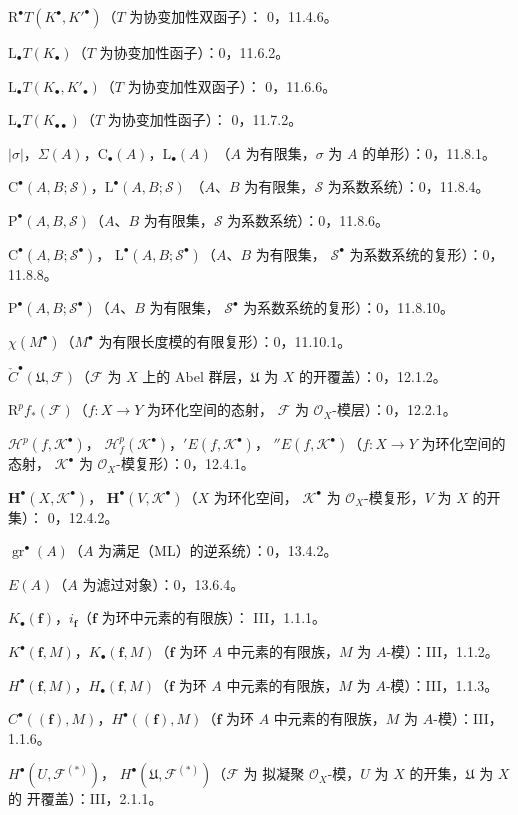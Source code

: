 \documentclass[UTF8,fontset=none,11pt,oneside,openany]{ctexbook}
\begin{document}
\begin{flushleft}
$\mathrm R^\bullet T(K^\bullet,K'^{\bullet})$（$T$ 为协变加性双函子）：
0，11.4.6。

$\mathrm L_\bullet T(K_\bullet)$（$T$ 为协变加性函子）：0，11.6.2。

$\mathrm L_\bullet T(K_\bullet,K'_\bullet)$（$T$ 为协变加性双函子）：
0，11.6.6。

$\mathrm L_\bullet T(K_{\bullet\bullet})$（$T$ 为协变加性函子）：
0，11.7.2。

$|\sigma|$，$\Sigma(A)$，$\mathrm C_\bullet(A)$，$\mathrm L_\bullet(A)$
（$A$ 为有限集，$\sigma$ 为 $A$ 的单形）：0，11.8.1。

$\mathrm C^\bullet(A,B;\mathscr S)$，$\mathrm L^\bullet(A,B;\mathscr S)$
（$A$、$B$ 为有限集，$\mathscr S$ 为系数系统）：0，11.8.4。

$\mathrm P^\bullet(A,B,\mathscr S)$（$A$、$B$ 为有限集，$\mathscr S$
为系数系统）：0，11.8.6。

$\mathrm C^\bullet(A,B;\mathscr S^\bullet)$，
$\mathrm L^\bullet(A,B;\mathscr S^\bullet)$（$A$、$B$ 为有限集，
$\mathscr S^\bullet$ 为系数系统的复形）：0，11.8.8。

$\mathrm P^\bullet(A,B;\mathscr S^\bullet)$（$A$、$B$ 为有限集，
$\mathscr S^\bullet$ 为系数系统的复形）：0，11.8.10。

$\chi(M^\bullet)$（$M^\bullet$ 为有限长度模的有限复形）：0，11.10.1。

$\check C^\bullet(\mathfrak U,\mathcal F)$（$\mathcal F$ 为 $X$ 上的
Abel 群层，$\mathfrak U$ 为 $X$ 的开覆盖）：0，12.1.2。

$\mathrm R^pf_*(\mathcal F)$（$f:X\to Y$ 为环化空间的态射，
$\mathcal F$ 为 $\mathcal O_X$-模层）：0，12.2.1。

$\mathcal H^p(f,\mathcal K^\bullet)$，
$\mathcal H_f^p(\mathcal K^\bullet)$，${}'E(f,\mathcal K^\bullet)$，
${}''E(f,\mathcal K^\bullet)$（$f:X\to Y$ 为环化空间的态射，
$\mathcal K^\bullet$ 为 $\mathcal O_X$-模复形）：0，12.4.1。

$\mathbf H^\bullet(X,\mathcal K^\bullet)$，
$\mathbf H^\bullet(V,\mathcal K^\bullet)$（$X$ 为环化空间，
$\mathcal K^\bullet$ 为 $\mathcal O_X$-模复形，$V$ 为 $X$ 的开集）：
0，12.4.2。

$\operatorname{gr}^\bullet(A)$（$A$ 为满足（ML）的逆系统）：0，13.4.2。

$E(A)$（$A$ 为滤过对象）：0，13.6.4。

$K_\bullet(\mathbf f)$，$i_{\mathbf f}$（$\mathbf f$ 为环中元素的有限族）：
III，1.1.1。

$K^\bullet(\mathbf f,M)$，$K_\bullet(\mathbf f,M)$（$\mathbf f$ 为环
$A$ 中元素的有限族，$M$ 为 $A$-模）：III，1.1.2。

$H^\bullet(\mathbf f,M)$，$H_\bullet(\mathbf f,M)$（$\mathbf f$ 为环
$A$ 中元素的有限族，$M$ 为 $A$-模）：III，1.1.3。

$C^\bullet((\mathbf f),M)$，$H^\bullet((\mathbf f),M)$（$\mathbf f$ 为环
$A$ 中元素的有限族，$M$ 为 $A$-模）：III，1.1.6。

$H^\bullet(U,\mathcal F^{(*)})$，
$H^\bullet(\mathfrak U,\mathcal F^{(*)})$（$\mathcal F$ 为
拟凝聚 $\mathcal O_X$-模，$U$ 为 $X$ 的开集，$\mathfrak U$ 为 $X$ 的
开覆盖）：III，2.1.1。
\end{flushleft}
\end{document}
